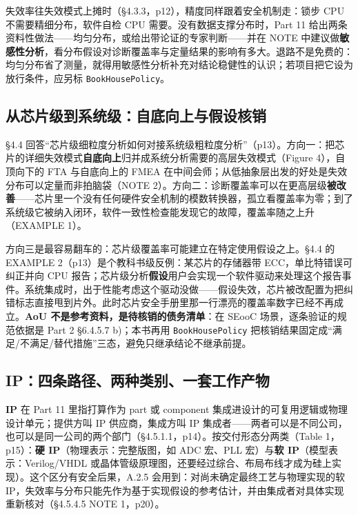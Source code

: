 失效率往失效模式上摊时（§4.3.3，p12），精度同样跟着安全机制走：锁步 CPU 不需要精细分布，软件自检 CPU 需要。没有数据支撑分布时，Part 11 给出两条资料性做法——均匀分布，或给出带论证的专家判断——并在 NOTE 中建议做\textbf{敏感性分析}，看分布假设对诊断覆盖率与定量结果的影响有多大。退路不是免费的：均匀分布省了测量，就得用敏感性分析补充对结论稳健性的认识；若项目把它设为放行条件，应另标 \nolinkurl{BookHousePolicy}。

\subsection{从芯片级到系统级：自底向上与假设核销}

§4.4 回答“芯片级细粒度分析如何对接系统级粗粒度分析”（p13）。方向一：把芯片的详细失效模式\textbf{自底向上}归并成系统分析需要的高层失效模式（Figure 4），自顶向下的 FTA 与自底向上的 FMEA 在中间会师；从低抽象层出发的好处是失效分布可以定量而非拍脑袋（NOTE 2）。方向二：诊断覆盖率可以在更高层级\textbf{被改善}——芯片里一个没有任何硬件安全机制的模数转换器，孤立看覆盖率为零；到了系统级它被纳入闭环，软件一致性检查能发现它的故障，覆盖率随之上升（EXAMPLE 1）。

方向三是最容易翻车的：芯片级覆盖率可能建立在特定使用假设之上。§4.4 的 EXAMPLE 2（p13）是个教科书级反例：某芯片的存储器带 ECC，单比特错误可纠正并向 CPU 报告；芯片级分析\textbf{假设}用户会实现一个软件驱动来处理这个报告事件。系统集成时，出于性能考虑这个驱动没做——假设失效，芯片被改配置为把纠错标志直接甩到片外。此时芯片安全手册里那一行漂亮的覆盖率数字已经不再成立。\textbf{AoU 不是参考资料，是待核销的债务清单}：在 SEooC 场景，逐条验证的规范依据是 Part 2 §6.4.5.7 b)；本书再用 \nolinkurl{BookHousePolicy} 把核销结果固定成“满足/不满足/替代措施”三态，避免只继承结论不继承前提。

\subsection{IP：四条路径、两种类别、一套工作产物}

\textbf{IP} 在 Part 11 里指打算作为 part 或 component 集成进设计的可复用逻辑或物理设计单元；提供方叫 IP 供应商，集成方叫 IP 集成者——两者可以是不同公司，也可以是同一公司的两个部门（§4.5.1.1，p14）。按交付形态分两类（Table 1，p15）：\textbf{硬 IP}（物理表示：完整版图，如 ADC 宏、PLL 宏）与\textbf{软 IP}（模型表示：Verilog/VHDL 或晶体管级原理图，还要经过综合、布局布线才成为硅上实现）。这个区分有安全后果，A.2.5 会用到：对尚未确定最终工艺与物理实现的软 IP，失效率与分布只能先作为基于实现假设的参考估计，并由集成者对具体实现重新核对（§4.5.4.5 NOTE 1，p20）。

